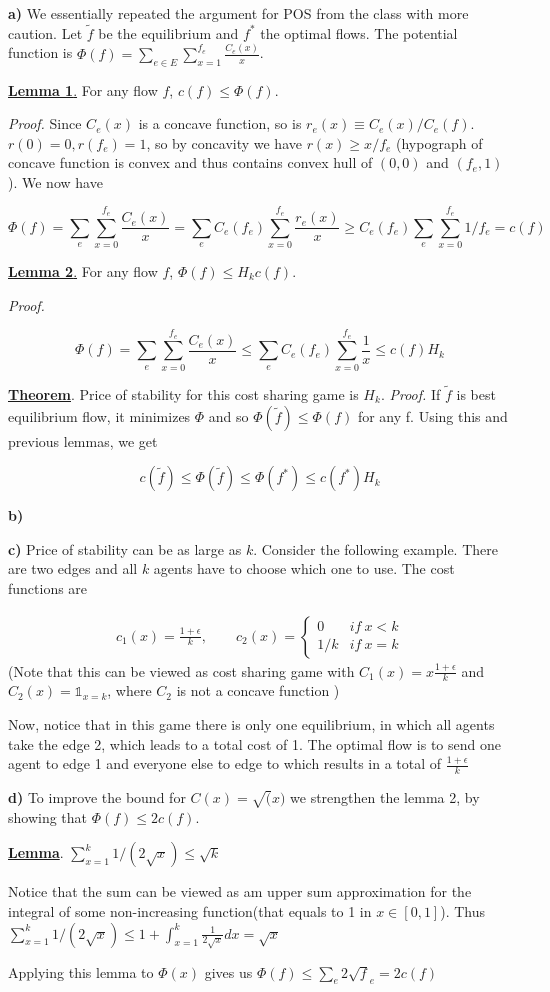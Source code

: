 \textbf{a)} We essentially repeated the argument for POS from the class with more caution. Let $\tilde f$ be the equilibrium and $f^*$ the optimal flows. The potential function is $\Phi(f) = \sum_{e\in E} \sum_{x=1}^{f_e} \frac{C_e(x)}{x}$. 

\uline{\textbf{Lemma 1}.} For any flow $f$, $c(f)\leq \Phi(f)$. 

\textit{Proof.} Since $C_e(x)$ is a concave function, so is $r_e(x)\equiv C_e(x)/C_e(f)$. $r(0)=0, r(f_e) =1$, so by concavity we have $r(x)\geq x/f_e$ (hypograph of concave function is convex and thus contains convex hull of  $(0,0)$ and $(f_e,1)$). We now have

$$
\Phi(f) = \sum_e \sum_{x=0}^{f_e} \frac{C_e(x)}{x} = \sum_e C_e(f_e)\sum_{x=0}^{f_e} \frac{r_e(x)}{x} \geq  C_e(f_e) \sum_e \sum_{x=0}^{f_e} 1/f_e = c(f)
$$

\uline{\textbf{Lemma 2}.} For any flow $f$, $\Phi(f)\leq H_k c(f)$.

\textit{Proof.} 

$$
\Phi(f) = \sum_e \sum_{x=0}^{f_e} \frac{C_e(x)}{x} \leq  \sum_e C_e(f_e) \sum_{x=0}^{f_e} \frac{1}{x} \leq c(f)H_k
$$

\uline{\textbf{Theorem}}. Price of stability for this cost sharing game is $H_k$.
\textit{Proof.} If $\tilde f$ is best equilibrium flow, it minimizes $\Phi$ and so $\Phi(\tilde f)\leq \Phi(f)$ for any f. Using this and previous lemmas, we get

$$ c(\tilde f) \leq \Phi(\tilde f) \leq \Phi (f^*) \leq c(f^*)H_k
$$

\textbf{b)}

\textbf{c)} Price of stability can be as large as $k$. Consider the following example. There are two edges and all $k$ agents have to choose which one to use. The cost functions are

\begin{align*}
c_1(x) = \frac{1+\epsilon}{k},\qquad c_2(x) = \begin{cases}0\quad &if\ x<k\\ 1/k & if\ x=k \end{cases}
\end{align*}
(Note that this can be viewed as cost sharing game with $C_1(x)=x \frac{1+\epsilon}{k}$ and $C_2(x)= \mathbb{1}_{x=k}$, where $C_2$ is not a concave function )

Now, notice that in this game there is only one equilibrium, in which all agents take the edge 2, which leads to a total cost of 1. The optimal flow is to send one agent to edge 1 and everyone else to edge to which results in a total of $\frac{1+\epsilon}{k}$

\textbf{d)} To improve the bound for $C(x)=\sqrt(x)$ we strengthen the lemma 2, by showing that $\Phi(f)\leq 2 c(f)$. 

\uline{\textbf{Lemma}}. $\sum_{x=1}^k 1/(2\sqrt x)\leq \sqrt k$

Notice that the sum can be viewed as am upper sum approximation for the integral of some non-increasing function(that equals to 1 in $x\in [0,1]$). Thus $\sum_{x=1}^k 1/(2\sqrt x)\leq 1+ \int_{x=1}^k \frac{1}{2\sqrt x}dx = \sqrt x$

Applying this lemma to $\Phi(x)$ gives us $\Phi(f)\leq \sum_e 2\sqrt f_e = 2 c(f)$